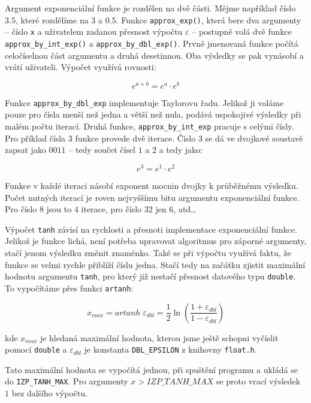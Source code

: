 \documentclass[12pt,a4paper,titlepage,final]{article}
\begin{document}
  Argument exponenciální funkce je rozdělen na dvě části. Mějme například číslo $3.5$,
  které rozdělíme na $3$ a $0.5$. Funkce \texttt{approx\_exp()}, která bere dva argumenty --
  číslo \texttt{x} a uživatelem zadanou přesnost výpočtu $\varepsilon$ -- postupně volá
  dvě funkce \texttt{approx\_by\_int\_exp()} a \texttt{approx\_by\_dbl\_exp()}. Prvně
  jmenovaná funkce počítá celočíselnou část argumentu a druhá desetinnou. Oba
  výsledky se pak vynásobí a vrátí uživateli. Výpočet využívá rovnosti:

  \[
  e^{a + b} = e^a \cdot e^b
  \]

  Funkce \texttt{approx\_by\_dbl\_exp} implementuje Taylorovu řadu. Jelikož ji voláme
  pouze pro čísla menší než jedna a větší než nula, podává uspokojivé výsledky při
  malém počtu iterací. Druhá funkce, \texttt{approx\_by\_int\_exp} pracuje s celými
  čísly. Pro příklad čísla $3$ funkce provede dvě iterace. Číslo $3$ se dá ve
  dvojkové soustavě zapsat jako $0011$ -- tedy součet čísel $1$ a $2$ a tedy jako:

  \[
  e^{3} = e^{1} \cdot e^{2}
  \]

  Funkce v každé iteraci násobí exponent mocnin dvojky k průběžnému výsledku. Počet nutných
  iterací je roven nejvyššímu bitu argumentu exponenciální funkce. Pro číslo $8$ jsou
  to $4$ iterace, pro číslo $32$ jen $6$, atd\ldots\newline

  \noindent
  Výpočet \texttt{tanh} závisí na rychlosti a přesnoti implementace exponenciální
  funkce. Jelikož je funkce lichá, není potřeba upravovat algoritmus pro záporné
  argumenty, stačí jenom výsledku změnit znaménko. Také se při výpočtu využívá faktu,
  že funkce se velmi rychle přiblíží číslu jedna. Stačí tedy na začátku zjistit maximální
  hodnotu argumentu \texttt{tanh}, pro který již nestačí přesnost datového typu
  \texttt{double}. To vypočítáme přes funkci \texttt{artanh}:

  \[
  x_{max} = artanh \; \varepsilon_{dbl} = \frac{1}{2} \ln \left( \frac{1 + \varepsilon_{dbl}}{1 - \varepsilon_{dbl}} \right)
  \]

  kde $x_{max}$ je hledaná maximální hodnota, kterou jsme ještě schopni vyčíslit pomocí
  \texttt{double} a $\varepsilon_{dbl}$ je konstanta \texttt{DBL\_EPSILON} z knihovny
  \texttt{float.h}.\newline

  \noindent
  Tato maximální hodnota se vypočítá jednou, při spuštění programu a ukládá se do
  \texttt{IZP\_TANH\_MAX}. Pro argumenty $x > IZP\_TANH\_MAX$ se proto vrací výsledek
  $1$ bez dalšího výpočtu.
\end{document}
